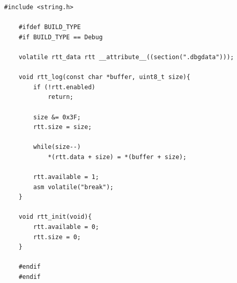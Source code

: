 \label{app:rtt-lib}

\begin{lstlisting}[style=C]
    #include <string.h>

    #ifdef BUILD_TYPE
    #if BUILD_TYPE == Debug

    volatile rtt_data rtt __attribute__((section(".dbgdata")));

    void rtt_log(const char *buffer, uint8_t size){
        if (!rtt.enabled)
            return;
            
        size &= 0x3F;
        rtt.size = size;

        while(size--)
            *(rtt.data + size) = *(buffer + size);
            
        rtt.available = 1;
        asm volatile("break");
    }

    void rtt_init(void){
        rtt.available = 0;
        rtt.size = 0;
    }

    #endif
    #endif
\end{lstlisting}


